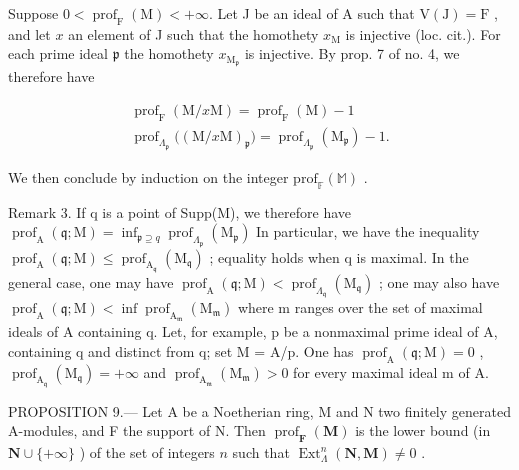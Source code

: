 Suppose \(0 < \operatorname{prof}_{\mathrm{F}}(\mathrm{M}) < +\infty\). Let J be an ideal of A such that \(\mathrm{V}(\mathrm{J}) = \mathrm{F}\) , and let \(x\) an element of J such that the homothety \(x_{\mathrm{M}}\) is injective (loc. cit.). For each prime ideal \(\mathfrak{p}\) the homothety \(x_{\mathrm{M}_{\mathfrak{p}}}\) is injective. By prop. 7 of no. 4, we therefore have

\[
\begin{array}{c} \operatorname{prof} _ {\mathrm{F}} (\mathrm{M} / x \mathrm{M}) = \operatorname{prof} _ {\mathrm{F}} (\mathrm{M}) - 1 \\ \operatorname{prof} _ {\Lambda_ {\mathfrak {p}}} \big ((\mathrm{M} / x \mathrm{M}) _ {\mathfrak {p}} \big) = \operatorname{prof} _ {\Lambda_ {\mathfrak {p}}} (\mathrm{M} _ {\mathfrak {p}}) - 1. \end{array}
\]

We then conclude by induction on the integer \(\mathrm{prof}_{\mathbb{F}}(\mathbb{M})\) .

Remark 3. If q is a point of Supp(M), we therefore have \(\operatorname{prof}_{\mathrm{A}}(\mathfrak{q};\mathrm{M}) = \inf_{\mathfrak{p}\supseteq q} \operatorname{prof}_{\Lambda_{\mathfrak{p}}}(\mathrm{M}_{\mathfrak{p}})\) In particular, we have the inequality \(\operatorname{prof}_{\mathrm{A}}(\mathfrak{q};\mathrm{M}) \leqslant \operatorname{prof}_{\mathrm{A}_{\mathfrak{q}}}(\mathrm{M}_{\mathfrak{q}})\) ; equality holds when q is maximal. In the general case, one may have \(\operatorname{prof}_{\mathrm{A}}(\mathfrak{q};\mathrm{M}) < \operatorname{prof}_{\Lambda_{\mathfrak{q}}}(\mathrm{M}_{\mathfrak{q}})\) ; one may also have \(\operatorname{prof}_{\mathrm{A}}(\mathfrak{q};\mathrm{M}) < \inf \operatorname{prof}_{\mathrm{A}_{\mathfrak{m}}}(\mathrm{M}_{\mathfrak{m}})\) where m ranges over the set of maximal ideals of A containing q. Let, for example, p be a nonmaximal prime ideal of A, containing q and distinct from q; set M = A/p. One has \(\operatorname{prof}_{\mathrm{A}}(\mathfrak{q};\mathrm{M}) = 0\) , \(\operatorname{prof}_{\mathrm{A}_{\mathfrak{q}}}(\mathrm{M}_{\mathfrak{q}}) = +\infty\) and \(\operatorname{prof}_{\mathrm{A}_{\mathfrak{m}}}(\mathrm{M}_{\mathfrak{m}}) > 0\) for every maximal ideal m of A.

PROPOSITION 9.--- Let A be a Noetherian ring, M and N two finitely generated A-modules, and F the support of N. Then \(\operatorname{prof}_{\mathbf{F}}(\mathbf{M})\) is the lower bound (in \(\mathbf{N} \cup \{+\infty\}\) ) of the set of integers \(n\) such that \(\operatorname{Ext}_{\Lambda}^{n}(\mathbf{N}, \mathbf{M}) \neq 0\) .

